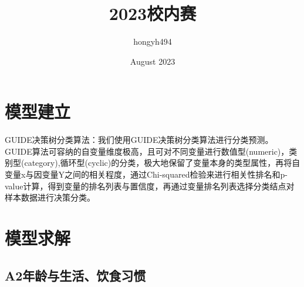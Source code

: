 \documentclass{article}
\title{2023校内赛}
\author{hongyh494}
\date{August 2023}
\begin{document}
\begin{CJK}{UTF8}{gbsn}
\maketitle

\section{模型建立}
GUIDE决策树分类算法：我们使用GUIDE决策树分类算法进行分类预测。GUIDE算法可容纳的自变量维度极高，且可对不同变量进行数值型(numeric)，类别型(category),循环型(cyclic)的分类，极大地保留了变量本身的类型属性，再将自变量x与因变量Y之间的相关程度，通过Chi-squared检验来进行相关性排名和p-value计算，得到变量的排名列表与置信度，再通过变量排名列表选择分类结点对样本数据进行决策分类。
\section{模型求解}
    \subsection{A2年龄与生活、饮食习惯}

\end{CJK}
\end{document}

